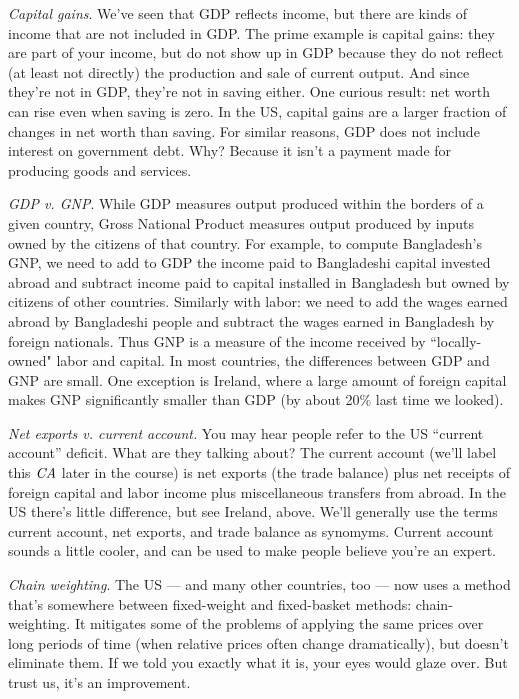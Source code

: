 \documentclass[12pt,letterpaper]{article}
\begin{document}
{\it Capital gains\/}. We've seen that GDP reflects income, but
there are kinds of income that are not included in GDP. The
prime example is capital gains:  they are part of your income, but
do not show up in GDP because they do not reflect (at least not
directly) the production and sale of current output. And since
they're not in GDP, they're not in saving either.
One curious result:  net worth can rise even when saving is zero.
In the US, capital gains are a larger fraction of changes in net worth
than saving.
For similar reasons, GDP does not include interest on government debt.
Why?  Because it isn't a payment
made for producing goods and services.


{\it GDP v. GNP\/}.
While GDP measures output produced within the borders of a
given country, Gross National Product measures output produced by
inputs owned by the citizens of that country. For example, to
compute Bangladesh's GNP, we need to add to GDP the income
paid to Bangladeshi capital invested abroad and subtract income
paid to capital installed in Bangladesh but owned by citizens of
other countries. Similarly with labor: we need to add the wages
earned abroad by Bangladeshi people and subtract the wages earned
in Bangladesh by foreign nationals. Thus GNP is a measure of
the income received by ``locally-owned" labor and capital. In most
countries, the differences between GDP and GNP are small.
One exception is Ireland, where a large amount of foreign capital
makes GNP significantly smaller than GDP (by about 20\% last
time we looked).

{\it  Net exports v. current account.} You may hear people refer
to the US ``current account'' deficit. What are they talking
about? The current account (we'll label this $\mbox{\it CA\/}$
later in the course) is net exports (the trade balance) plus net
receipts of foreign capital and labor income plus miscellaneous
transfers from abroad. In the US there's little difference, but
see Ireland, above.  We'll generally use the terms
current account, net exports, and trade balance as synomyms.
Current account sounds a little cooler, and can be used to make
people believe you're an expert.


{\it Chain weighting\/}.
The US --- and many other countries, too ---
now uses a method that's somewhere between fixed-weight and fixed-basket methods:  chain-weighting.
It mitigates some of the problems of applying the same prices over
long periods of time (when relative prices often change dramatically),
but doesn't eliminate them.
If we told you exactly what it is, your eyes would glaze over.
But trust us, it's an improvement.
\end{document}
